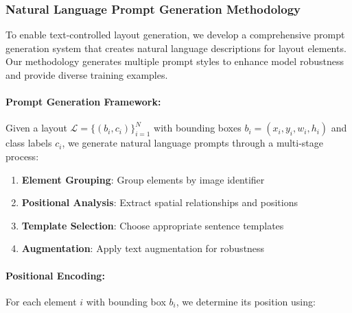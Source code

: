 \documentclass[journal,article,submit,pdftex,moreauthors]{Definitions/mdpi}
\begin{document}
\subsubsection{Natural Language Prompt Generation Methodology}

To enable text-controlled layout generation, we develop a comprehensive prompt generation system that creates natural language descriptions for layout elements. Our methodology generates multiple prompt styles to enhance model robustness and provide diverse training examples.

\paragraph{Prompt Generation Framework:}

Given a layout $\mathcal{L} = \{(b_i, c_i)\}_{i=1}^{N}$ with bounding boxes $b_i = (x_i, y_i, w_i, h_i)$ and class labels $c_i$, we generate natural language prompts through a multi-stage process:

\begin{enumerate}
\item \textbf{Element Grouping}: Group elements by image identifier
\item \textbf{Positional Analysis}: Extract spatial relationships and positions
\item \textbf{Template Selection}: Choose appropriate sentence templates
\item \textbf{Augmentation}: Apply text augmentation for robustness
\end{enumerate}

\paragraph{Positional Encoding:}

For each element $i$ with bounding box $b_i$, we determine its position using:
\end{document}
